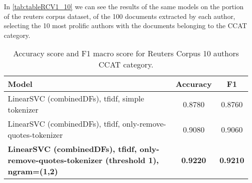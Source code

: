 In \autoref{tab:tableRCV1_10} we can see the results of the same models on the portion of the reuters corpus dataset, of the 100 documents extracted by each author, selecting the 10 most prolific authors with the documents belonging to the CCAT category.\\

\begin{table}[h!]
	\begin{center}  
		\caption[Reuters Corpus Results - 10 authors]{Accuracy score and F1 macro score for Reuters Corpus 10 authors CCAT category.} 
		\label{tab:tableRCV1_10}
		\begin{tabular}{| p{5 cm} | c | c |}
			\hline 
			Model & Accuracy & F1 \\
			\hline
			LinearSVC (combinedDFs), tfidf, simple tokenizer & 0.8780 & 0.8760 \\ \hline
			LinearSVC (combinedDFs), tfidf, only-remove-quotes-tokenizer & 0.9080 & 0.9060 \\ \hline
			\textbf{LinearSVC (combinedDFs), tfidf, only-remove-quotes-tokenizer (threshold 1),
			ngram=(1,2)} & \textbf{0.9220} & \textbf{0.9210} \\ \hline
		\end{tabular} 
	\end{center}
\end{table}

